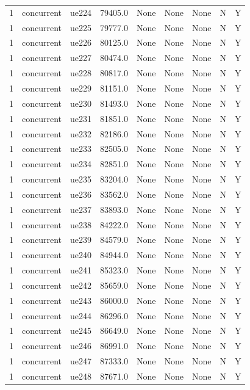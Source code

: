 \begin{table}[ht]
\begin{tabular}{|c|c|c|c|c|c|c|c|c|}
1 & concurrent & ue224 & 79405.0 & None & None & None & N & Y \\
1 & concurrent & ue225 & 79777.0 & None & None & None & N & Y \\
1 & concurrent & ue226 & 80125.0 & None & None & None & N & Y \\
1 & concurrent & ue227 & 80474.0 & None & None & None & N & Y \\
1 & concurrent & ue228 & 80817.0 & None & None & None & N & Y \\
1 & concurrent & ue229 & 81151.0 & None & None & None & N & Y \\
1 & concurrent & ue230 & 81493.0 & None & None & None & N & Y \\
1 & concurrent & ue231 & 81851.0 & None & None & None & N & Y \\
1 & concurrent & ue232 & 82186.0 & None & None & None & N & Y \\
1 & concurrent & ue233 & 82505.0 & None & None & None & N & Y \\
1 & concurrent & ue234 & 82851.0 & None & None & None & N & Y \\
1 & concurrent & ue235 & 83204.0 & None & None & None & N & Y \\
1 & concurrent & ue236 & 83562.0 & None & None & None & N & Y \\
1 & concurrent & ue237 & 83893.0 & None & None & None & N & Y \\
1 & concurrent & ue238 & 84222.0 & None & None & None & N & Y \\
1 & concurrent & ue239 & 84579.0 & None & None & None & N & Y \\
1 & concurrent & ue240 & 84944.0 & None & None & None & N & Y \\
1 & concurrent & ue241 & 85323.0 & None & None & None & N & Y \\
1 & concurrent & ue242 & 85659.0 & None & None & None & N & Y \\
1 & concurrent & ue243 & 86000.0 & None & None & None & N & Y \\
1 & concurrent & ue244 & 86296.0 & None & None & None & N & Y \\
1 & concurrent & ue245 & 86649.0 & None & None & None & N & Y \\
1 & concurrent & ue246 & 86991.0 & None & None & None & N & Y \\
1 & concurrent & ue247 & 87333.0 & None & None & None & N & Y \\
1 & concurrent & ue248 & 87671.0 & None & None & None & N & Y \\

\end{tabular}
\end{table}
